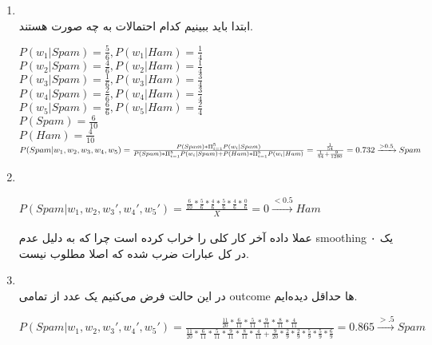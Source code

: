 \begin{enumerate}
  \item \phantom{text}
        \\
        ابتدا باید ببینیم کدام احتمالات به چه صورت هستند.\\
        \begin{latin}
          $P(w_1|Spam) = \frac{5}{6} , P(w_1|Ham) = \frac{1}{4}$\\
          $P(w_2|Spam) = \frac{4}{6} , P(w_2|Ham) = \frac{1}{4}$\\
          $P(w_3|Spam) = \frac{1}{6} , P(w_3|Ham) = \frac{3}{4}$\\
          $P(w_4|Spam) = \frac{2}{6} , P(w_4|Ham) = \frac{3}{4}$\\
          $P(w_5|Spam) = \frac{6}{6} , P(w_5|Ham) = \frac{2}{4}$\\
          $P(Spam) = \frac{6}{10}$\\
          $P(Ham) = \frac{4}{10}$\\
          $P(Spam|w_1,w_2,w_3,w_4,w_5) = \frac{P(Spam) * \Pi_{i=1}^{5}P(w_i|Spam)}{P(Spam) * \Pi_{i=1}^{5}P(w_i|Spam)+P(Ham) * \Pi_{i=1}^{5}P(w_i|Ham)} = \frac{\frac{1}{54}}{\frac{1}{54}+\frac{9}{1280}} \\
            = 0.732 \xrightarrow[]{>0.5} Spam$
        \end{latin}
  \item \phantom{text}
        \\
        \begin{latin}
          $P(Spam|w_1,w_2,w_3',w_4',w_5') = \frac{\frac{6}{10}*\frac{5}{6}*\frac{4}{6}*\frac{5}{6}*\frac{4}{6}*\frac{0}{6}}{X}=0 \xrightarrow[]{<0.5}Ham$
        \end{latin}
        عملا داده آخر کار کلی را خراب کرده است چرا که به دلیل عدم smoothing یک ۰ در کل عبارات ضرب شده که اصلا مطلوب نیست.
  \item \phantom{text}
        \\
        در این حالت فرض می‌کنیم یک عدد از تمامی outcome ها حداقل دیده‌ایم.
        \begin{latin}
          $P(Spam|w_1,w_2,w_3',w_4',w_5') = \frac{\frac{11}{20}*\frac{6}{11}*\frac{5}{11}*\frac{9}{11}*\frac{8}{11}*\frac{4}{11}}{\frac{11}{20}*\frac{6}{11}*\frac{5}{11}*\frac{9}{11}*\frac{8}{11}*\frac{4}{11}+\frac{9}{20}*\frac{2}{9}*\frac{2}{9}*\frac{5}{9}*\frac{5}{9}*\frac{6}{9}}=0.865 \xrightarrow[]{>.5}Spam$
        \end{latin}
\end{enumerate}
